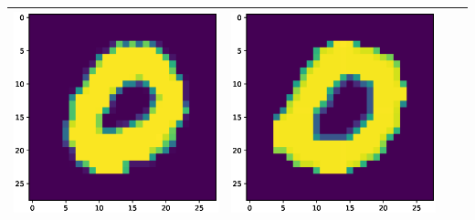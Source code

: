 \documentclass{article}
\begin{document}
\begin{tabular}{cccc}
\includegraphics[scale=.1]{fig/MNIST_771_2_2_875_0.eps} &
\includegraphics[scale=.1]{fig/MNIST_771_2_3_793_0.eps}

\\ \hline 




\end{tabular}
\end{document}
